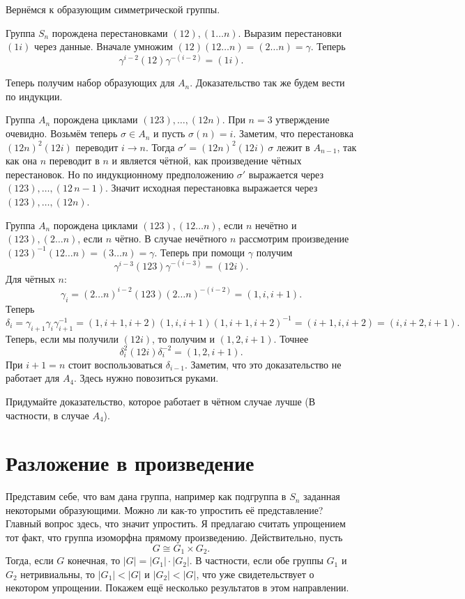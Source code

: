 Вернёмся к образующим симметрической группы.

\utv Группа $S_n$ порождена перестановками $(12), (1 \dots n)$. 
\proof Выразим перестановки $(1i)$ через данные. Вначале умножим $(12)(12\dots n)=(2\dots n)=\gamma$. Теперь
$$\gamma^{i-2}(12)\gamma^{-(i-2)}=(1i).$$
\endproof
\eutv

Теперь получим набор образующих для $A_n$. Доказательство так же будем вести по индукции.


\thrm Группа $A_n$ порождена циклами $(123),\dots,(12n)$. 
\ethrm
\proof При $n=3$ утверждение очевидно. Возьмём теперь $\sigma\in A_n$ и пусть $\sigma(n)=i$. Заметим, что перестановка $(12n)^2(12i)$ переводит $i\to n$. Тогда $\sigma'=(12n)^2(12i) \,\sigma$ лежит в  $A_{n-1}$, так как она $n$ переводит в $n$ и является чётной, как произведение чётных перестановок. Но по индукционному предположению $\sigma'$ выражается через $(123),\dots,(12\,n-1)$. Значит исходная перестановка выражается через $(123),\dots,(12n)$.
\endproof


\utv Группа $A_n$ порождена циклами $(123),(12\dots n)$, если $n$ нечётно  и  $(123),(2\dots n)$, если $n$ чётно.
\proof В случае нечётного $n$ рассмотрим произведение $(123)^{-1}(12\dots n)=(3\dots n )= \gamma$. Теперь при помощи $\gamma$ получим 
$$\gamma^{i-3}(123)\gamma^{-(i-3)}=(12i).$$
Для чётных $n$:
$$\gamma_i= (2\dots n)^{i-2} (123)(2\dots n)^{-(i-2)}=(1, i,i+1).$$
Теперь 
$$\delta_i=\gamma_{i+1}\gamma_i \gamma_{i+1}^{-1}= (1, i+1,i+2)(1, i,i+1)(1, i+1,i+2)^{-1}=(i+1,i,i+2)=(i,i+2,i+1).$$
Теперь, если мы получили $(12i)$, то получим и $(1,2, i+1)$. Точнее
$$\delta_i^2 (12i)\delta_i^{-2}=(1,2,i+1).$$
При $i+1=n$ стоит воспользоваться $\delta_{i-1}$. Заметим, что это доказательство не работает для $A_4$. Здесь нужно повозиться руками.
\endproof
\eutv


\upr Придумайте доказательство, которое работает в чётном случае лучше (В частности, в случае $A_4$).
\eupr



\section{Разложение в произведение}
Представим себе, что вам дана группа, например как подгруппа в $S_n$ заданная некоторыми образующими. Можно ли как-то упростить её представление? Главный вопрос здесь, что значит упростить. Я предлагаю считать упрощением тот факт, что группа изоморфна прямому произведению. Действительно, пусть 
$$G\cong G_1 \times G_2.$$
Тогда, если  $G$ конечная, то $|G|=|G_1|\cdot |G_2|$. В частности, если обе группы $G_1$ и $G_2$ нетривиальны, то $|G_1|< |G|$ и $|G_2|<|G|$, что уже свидетельствует о некотором упрощении. Покажем ещё несколько результатов в этом направлении.

